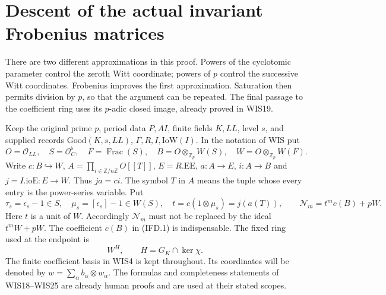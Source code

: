 \section{Descent of the actual invariant Frobenius matrices}
\label{sec:invariant-frobenius-descent-v055}


There are two different approximations in this proof. Powers of the
cyclotomic parameter control the zeroth Witt coordinate; powers of $p$
control the successive Witt coordinates. Frobenius improves the first
approximation. Saturation then permits division by $p$, so that the
argument can be repeated. The final passage to the coefficient ring uses
its $p$-adic closed image, already proved in WIS19.

Keep the original prime $p$, period data $P,AI$, finite fields $K,LL$,
level $s$, and supplied records $\mathrm{Good}(K,s,LL)$,
$\Gamma,R,I,\mathrm{IoW}(I)$. In the notation of WIS put
\[
 O=\mathcal O_{LL},\quad S=\mathcal O_C^\flat,\quad F=\operatorname{Frac}(S),
 \quad B=O\otimes_{\mathbb Z_p}W(S),\quad W=O\otimes_{\mathbb Z_p}W(F).
\]
Write $c:B\hookrightarrow W$, $A=\prod_{i\in\mathbb Z/n\mathbb Z}O[[T]]$,
$E=R.\mathrm{EE}$, $a:A\to E$, $i:A\to B$ and $j=I.\mathrm{ioE}:E\to W$.
Thus $ja=ci$. The symbol $T$ in $A$ means the tuple whose every entry
is the power-series variable. Put
\[
 \tau_s=\epsilon_s-1\in S,\quad \mu_s=[\epsilon_s]-1\in W(S),\quad
 t=c(1\otimes\mu_s)=j(a(T)),\qquad
 \mathcal N_m=t^mc(B)+pW.                                      \tag{IFD.1}
\]
Here $t$ is a unit of $W$. Accordingly $\mathcal N_m$ must not be
replaced by the ideal $t^mW+pW$. The coefficient $c(B)$ in (IFD.1)
is indispensable. The fixed ring used at the endpoint is
\[
 W^H,\qquad H=G_K\cap\ker\chi.
                                                               \tag{IFD.2}
\]
The finite coefficient basis in WIS4 is kept throughout. Its coordinates
will be denoted by $w=\sum_\alpha b_\alpha\otimes w_\alpha$.
The formulas and completeness statements of WIS18--WIS25 are already
human proofs and are used at their stated scopes.


